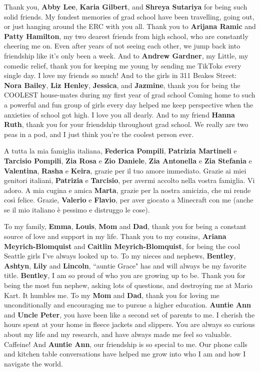 \documentclass{ucetd}
\begin{document}
Thank you, \textbf{Abby Lee}, \textbf{Karia Gilbert}, and \textbf{Shreya Sutariya} for being such solid friends.  My fondest memories of grad school have been travelling, going out, or just hanging around the ERC with you all.  Thank you to \textbf{Arijana Ramic} and \textbf{Patty Hamilton}, my two dearest friends from high school, who are constantly cheering me on.  Even after years of not seeing each other, we jump back into friendship like it's only been a week.  And to \textbf{Andrew Gardner}, my Little, my comedic relief, thank you for keeping me young by sending me TikToks every single day.  I love my friends so much!  And to the girls in 311 Beakes Street: \textbf{Nora Bailey}, \textbf{Liz Henley}, \textbf{Jessica}, and \textbf{Jazmine}, thank you for being the COOLEST house-mates during my first year of grad school  Coming home to such a powerful and fun group of girls every day helped me keep perspective when the anxieties of school got high.  I love you all dearly.  And to my friend \textbf{Hanna Ruth}, thank you for your friendship throughout grad school.  We really are two peas in a pod, and I just think you're the coolest person ever.

A tutta la mia famiglia italiana, \textbf{Federica Pompili}, \textbf{Patrizia Martineli} e \textbf{Tarcisio Pompili}, \textbf{Zia Rosa} e \textbf{Zio Daniele}, \textbf{Zia Antonella} e \textbf{Zia Stefania} e \textbf{Valentina}, \textbf{Rasha} e \textbf{Keira}, grazie per il tuo amore immediato.  Grazie ai miei genitori italiani, \textbf{Patrizia} e \textbf{Tarcisio}, per avermi accolto nella vostra famiglia.  Vi adoro.  A mia cugina e amica \textbf{Marta}, grazie per la nostra amicizia, che mi rende così felice.  Grazie, \textbf{Valerio} e \textbf{Flavio}, per aver giocato a Minecraft con me (anche se il mio italiano è pessimo e distruggo le cose).

To my family, \textbf{Emma}, \textbf{Louis}, \textbf{Mom} and \textbf{Dad}, thank you for being a constant source of love and support in my life.  Thank you to my cousins, \textbf{Ariana Meyrich-Blomquist} and \textbf{Caitlin Meyrich-Blomquist}, for being the cool Seattle girls I've always looked up to.  To my nieces and nephews, \textbf{Bentley}, \textbf{Ashtyn}, \textbf{Lily} and \textbf{Lincoln}, ``auntie Grace" has and will always be my favorite title.  \textbf{Bentley}, I am so proud of who you are growing up to be.  Thank you for being the most fun nephew, asking lots of questions, and destroying me at Mario Kart.  It humbles me.  To my \textbf{Mom} and \textbf{Dad}, thank you for loving me unconditionally and encouraging me to pursue a higher education.  \textbf{Auntie Ann} and \textbf{Uncle Peter}, you have been like a second set of parents to me. 
 I cherish the hours spent at your home in fleece jackets and slippers.  You are always so curious about my life and my research, and have always made me feel so valuable. Caffeine!  And \textbf{Auntie Ann}, our friendship is so special to me.  Our phone calls and kitchen table conversations have helped me grow into who I am and how I navigate the world.
\end{document}
